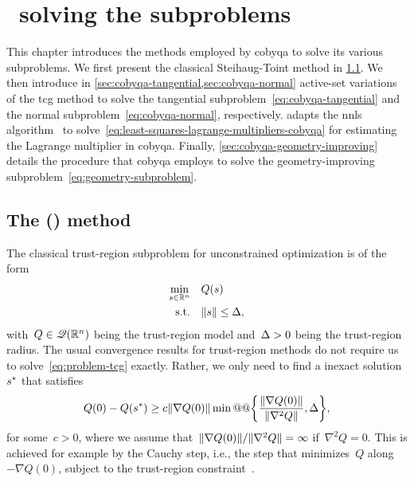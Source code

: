 %
%
%
\chapter{ \textemdash\ solving the subproblems}
\label{ch:cobyqa-subproblems}

This chapter introduces the methods employed by \gls{cobyqa} to solve its various subproblems.
We first present the classical Steihaug-Toint  method in \cref{sec:tcg}.
We then introduce in \cref{sec:cobyqa-tangential,sec:cobyqa-normal} active-set variations of the \gls{tcg} method to solve the tangential subproblem~\cref{eq:cobyqa-tangential} and the normal subproblem~\cref{eq:cobyqa-normal}, respectively.
 adapts the \gls{nnls} algorithm~\cite[Alg.~23.10]{Lawson_Hanson_1987} to solve~\cref{eq:least-squares-lagrange-multipliers-cobyqa} for estimating the Lagrange multiplier in \gls{cobyqa}.
Finally, \cref{sec:cobyqa-geometry-improving} details the procedure that \gls{cobyqa} employs to solve the geometry-improving subproblem~\cref{eq:geometry-subproblem}.

\section{The  () method}
\label{sec:tcg}

The classical trust-region subproblem for unconstrained optimization is of the form
\begin{subequations}
    \label{eq:problem-tcg}
    \begin{align}
        \min_{\sstep \in \R^n}  & \quad Q(\sstep)\\
        \text{s.t.}             & \quad \norm{\sstep} \le \rad,
    \end{align}
\end{subequations}
with~$Q \in \mathscr{Q}(\mathbb{R}^n)$ being the trust-region model and~$\rad > 0$ being the trust-region radius.
The usual convergence results for trust-region methods do not require us to solve~\cref{eq:problem-tcg} exactly.
Rather, we only need to find a inexact solution~$\sstep[\ast]$ that satisfies
\begin{equation*}
    Q(0) - Q(\sstep[\ast]) \ge c \norm{\nabla Q(0)} \min @@ \set[\bigg]{\frac{\norm{\nabla Q(0)}}{\norm{\nabla^2 Q}}, \rad},
\end{equation*}
for some~$c > 0$, where we assume that~$\lVert\nabla Q(0)\rVert / \lVert\nabla^2 Q\rVert = \infty$ if~$\nabla^2 Q = 0$.
This is achieved for example by the Cauchy step, i.e., the step that minimizes~$Q$ along~$-\nabla Q(0)$, subject to the trust-region constraint~\cite[Thm.~4]{Powell_1975b}.


